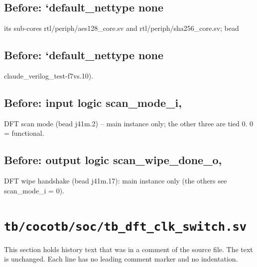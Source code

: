 \begin{record}

\subsection*{Before: `default\_nettype none}

\begin{textblock}
its sub-cores rtl/periph/aes128_core.sv and rtl/periph/sha256_core.sv; bead
\end{textblock}

\subsection*{Before: `default\_nettype none}

\begin{textblock}
claude_verilog_test-f7vs.10).
\end{textblock}

\subsection*{Before: input  logic scan\_mode\_i,}

\begin{textblock}
DFT scan mode (bead j41m.2) -- main instance only; the other three are tied 0. 0 = functional.
\end{textblock}

\subsection*{Before: output logic              scan\_wipe\_done\_o,}

\begin{textblock}
DFT wipe handshake (bead j41m.17): main instance only (the others see scan_mode_i = 0).
\end{textblock}

\end{record}

\section{\texttt{tb/cocotb/soc/tb\_dft\_clk\_switch.sv}}\label{cr:suite:soc-tb-dft-clk-switch-sv}

This section holds history text that was in a comment of the source file. The text is unchanged. Each line has no leading comment marker and no indentation.

